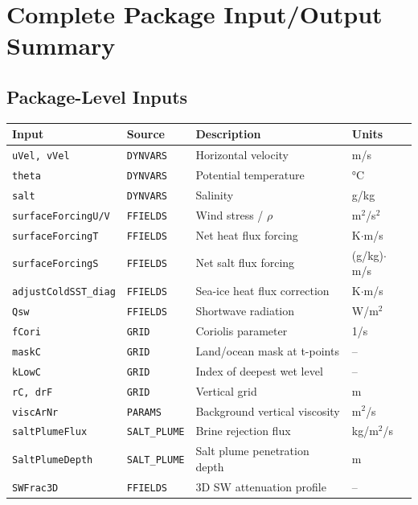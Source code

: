 \documentclass[12pt,letterpaper]{article}
\begin{document}
\section{Complete Package Input/Output Summary}  
  
\subsection{Package-Level Inputs}  
  
\begin{longtable}{p{3.5cm} p{3cm} p{5cm} l}  
\toprule  
\textbf{Input} & \textbf{Source} & \textbf{Description} & \textbf{Units} \\  
\midrule  
\endhead  
\texttt{uVel, vVel} & \texttt{DYNVARS} & Horizontal velocity & m/s \\  
\texttt{theta} & \texttt{DYNVARS} & Potential temperature & °C \\  
\texttt{salt} & \texttt{DYNVARS} & Salinity & g/kg \\  
\texttt{surfaceForcingU/V} & \texttt{FFIELDS} & Wind stress / $\rho$ & m$^2$/s$^2$ \\  
\texttt{surfaceForcingT} & \texttt{FFIELDS} & Net heat flux forcing & K$\cdot$m/s \\  
\texttt{surfaceForcingS} & \texttt{FFIELDS} & Net salt flux forcing & (g/kg)$\cdot$m/s \\  
\texttt{adjustColdSST\_diag} & \texttt{FFIELDS} & Sea-ice heat flux correction & K$\cdot$m/s \\  
\texttt{Qsw} & \texttt{FFIELDS} & Shortwave radiation & W/m$^2$ \\  
\texttt{fCori} & \texttt{GRID} & Coriolis parameter & 1/s \\  
\texttt{maskC} & \texttt{GRID} & Land/ocean mask at t-points & -- \\  
\texttt{kLowC} & \texttt{GRID} & Index of deepest wet level & -- \\  
\texttt{rC, drF} & \texttt{GRID} & Vertical grid & m \\  
\texttt{viscArNr} & \texttt{PARAMS} & Background vertical viscosity & m$^2$/s \\  
\texttt{saltPlumeFlux} & \texttt{SALT\_PLUME} & Brine rejection flux & kg/m$^2$/s \\  
\texttt{SaltPlumeDepth} & \texttt{SALT\_PLUME} & Salt plume penetration depth & m \\  
\texttt{SWFrac3D} & \texttt{FFIELDS} & 3D SW attenuation profile & -- \\  
\bottomrule  
\end{longtable}  
  
\end{document}
